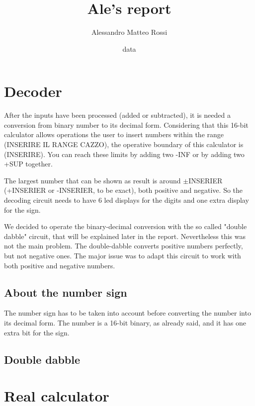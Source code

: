 \documentclass{article}
\title{Ale's report}
\author{Alessandro Matteo Rossi}
\date{data}
\begin{document}
\maketitle




\tableofcontents

\clearpage

\section{Decoder}

After the inputs have been processed (added or subtracted), it is needed a conversion from binary number to its decimal form. Considering that this 16-bit calculator allows operations the user to insert numbers within the range (INSERIRE IL RANGE CAZZO), the operative boundary of this calculator is (INSERIRE). You can reach these limits by adding two -INF or by adding two +SUP together.

\vspace{3mm}

The largest number that can be shown as result is around $\pm$INSERIER (+INSERIER or -INSERIER, to be exact), both positive and negative. So the decoding circuit needs to have 6 led displays for the digits and one extra display for the sign.

\vspace{3mm}

We decided to operate the binary-decimal conversion with the so called "double dabble" circuit, that will be explained later in the report. Nevertheless this was not the main problem. The double-dabble converts positive numbers perfectly, but not negative ones. The major issue was to adapt this circuit to work with both positive and negative numbers. 

\subsection{About the number sign}

The number sign has to be taken into account before converting the number into its decimal form. The number is a 16-bit binary, as already said, and it has one extra bit for the sign. 


\subsection{Double dabble}

\section{Real calculator}
\end{document}
